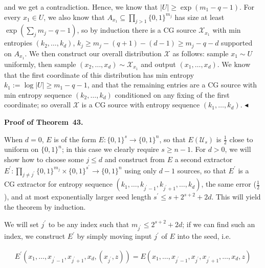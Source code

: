 and we get a contradiction. Hence, we know that $|U|\geq\exp(m_{1}-q-1)$. For every $x_{1}\in U$, we also know that $A_{x_{1}}\subseteq\prod_{j>1}\{0,1\}^{m_{j}}$ has size at least $\exp(\sum_{j}m_{j}-q-1)$, so by induction there is a CG source $\mathcal{X}_{x_{1}}$ with min entropies $(k_{2},\ldots,k_{d})$, $k_{j}\geq m_{j}-(q+1)-(d-1)\geq m_{j}-q-d$ supported on $A_{x_{1}}$. We then construct our overall distribution $\mathcal{X}$ as follows: sample $x_{1}\sim U$ uniformly, then sample $(x_{2},\ldots,x_{d})\sim\mathcal{X}_{x_{1}}$ and output $(x_{1},\ldots,x_{d})$. We know that the first coordinate of this distribution has min entropy $k_{1}:=\log|U|\geq m_{1}-q-1$, and that the remaining entries are a CG source with min entropy sequence $(k_{2},\ldots,k_{d})$ conditioned on any fixing of the first coordinate; so overall $\mathcal{X}$ is a CG source with entropy sequence $(k_{1},\ldots,k_{d})$.
$\blacktriangleleft$\par





\par\medskip\noindent\textbf{Proof of Theorem 43.}\par




When $d=0$, $E$ is of the form $E:\{0,1\}^{s}\to\{0,1\}^{n}$, so that $E(\mathcal{U}_{s})$ is $\frac{1}{2}$ close to uniform on $\{0,1\}^{n}$; in this case we clearly require $s\geq n-1$. For $d>0$, we will show how to choose some $j\leq d$ and construct from $E$ a second extractor $E^{\prime}:\prod_{j\neq j^{\prime}}\{0,1\}^{m_{j}}\times\{0,1\}^{s^{\prime}}\to\{0,1\}^{n}$ using only $d-1$ sources, so that $E^{\prime}$ is a CG extractor for entropy sequence $(k_{1},\ldots,k_{j^{\prime}-1},k_{j^{\prime}+1},\ldots,k_{d})$, the same error ($\frac{1}{2}$), and at most exponentially larger seed length $s^{\prime}\leq s+2^{s+2}+2d$. This will yield the theorem by induction.\par




We will set $j^{\prime}$ to be any index such that $m_{j^{\prime}}\leq 2^{s+2}+2d$; if we can find such an index, we construct $E^{\prime}$ by simply moving input $j^{\prime}$ of $E$ into the seed, i.e.\par


\[\begin{gathered}
E^{\prime}(x_{1},\ldots,x_{j^{\prime}-1},x_{j^{\prime}+1},x_{d},(x_{j^{\prime}},z))=E(x_{1},\ldots,x_{j^{\prime}-1},x_{j^{\prime}},x_{j^{\prime}+1},\ldots,x_{d},z)
\end{gathered}\]



